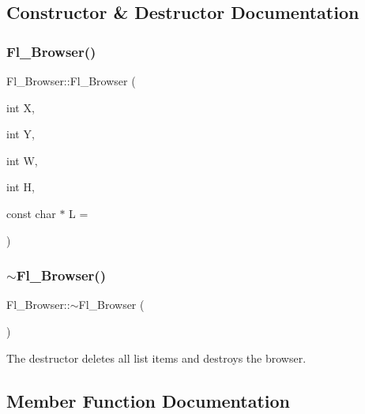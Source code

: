 \subsection{Constructor \& Destructor Documentation}
\mbox{\label{class_fl___browser_a5d3af1b476a55adac06f5c07ed897243}} 
\subsubsection{\texorpdfstring{Fl\+\_\+\+Browser()}{Fl\_Browser()}}
{\footnotesize\ttfamily Fl\+\_\+\+Browser\+::\+Fl\+\_\+\+Browser (\begin{DoxyParamCaption}\item[{int}]{X,  }\item[{int}]{Y,  }\item[{int}]{W,  }\item[{int}]{H,  }\item[{const char $\ast$}]{L = {} }\end{DoxyParamCaption})}

\mbox{\label{class_fl___browser_abe85f8086c10a9f3d65109beedaa91ff}} 
\subsubsection{\texorpdfstring{$\sim$\+Fl\+\_\+\+Browser()}{~Fl\_Browser()}}
{\footnotesize\ttfamily Fl\+\_\+\+Browser\+::$\sim$\+Fl\+\_\+\+Browser (\begin{DoxyParamCaption}{ }\end{DoxyParamCaption})\hspace{0.3cm}{\ttfamily [inline]}}

The destructor deletes all list items and destroys the browser. 

\subsection{Member Function Documentation}
\mbox{\label{class_fl___browser_af5fc9ac53bf1025f739868758240845f}} 
